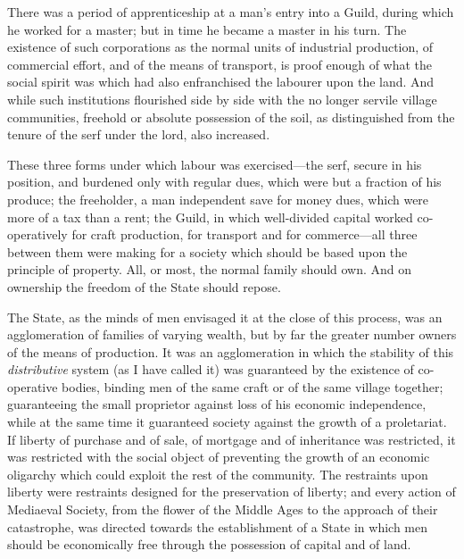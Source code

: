 \documentclass{book}
\begin{document}
There was a period of apprenticeship at a man’s entry into a Guild, during which he worked for a master; but in time he became a master in his turn. The existence of such corporations as the normal units of industrial production, of commercial effort, and of the means of transport, is proof enough of what the social spirit was which had also enfranchised the labourer upon the land. And while such institutions flourished side by side with the no longer servile village communities, freehold or absolute possession of the soil, as distinguished from the tenure of the serf under the lord, also increased.

These three forms under which labour was exercised—the serf, secure in his position, and burdened only with regular dues, which were but a fraction of his produce; the freeholder, a man independent save for money dues, which were more of a tax than a rent; the Guild, in which well-divided capital worked co-operatively for craft production, for transport and for commerce—all three between them were making for a society which should be based upon the principle of property. All, or most, the normal family should own. And on ownership the freedom of the State should repose.

The State, as the minds of men envisaged it at the close of this process, was an agglomeration of families of varying wealth, but by far the greater number owners of the means of production. It was an agglomeration in which the stability of this \emph{distributive} system (as I have called it) was guaranteed by the existence of co-operative bodies, binding men of the same craft or of the same village together; guaranteeing the small proprietor against loss of his economic independence, while at the same time it guaranteed society against the growth of a proletariat. If liberty of purchase and of sale, of mortgage and of inheritance was restricted, it was restricted with the social object of preventing the growth of an economic oligarchy which could exploit the rest of the community. The restraints upon liberty were restraints designed for the preservation of liberty; and every action of Mediaeval Society, from the flower of the Middle Ages to the approach of their catastrophe, was directed towards the establishment of a State in which men should be economically free through the possession of capital and of land.
\end{document}
